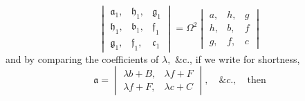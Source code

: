 \documentclass[11pt]{article}
\begin{document}
\[ \begin{vmatrix} \mathfrak{a}_1, & \mathfrak{h}_1, & \mathfrak{g}_1 \\ \mathfrak{h}_1, & \mathfrak{b}_1, & \mathfrak{f}_1 \\ \mathfrak{g}_1, & \mathfrak{f}_1, & \mathfrak{c}_1 \end{vmatrix} = \Omega^2 \begin{vmatrix} a, & h, & g \\ h, & b, & f \\ g, & f, & c \end{vmatrix} \]
and by comparing the coefficients of $\lambda,$ \&c., if we write for shortness,
\[ \mathfrak{a} = \begin{vmatrix} \lambda b + B,& \lambda f + F\\ \lambda f + F,& \lambda c + C \end{vmatrix}, \quad \&c., \quad \text{then} \]
\end{document}
